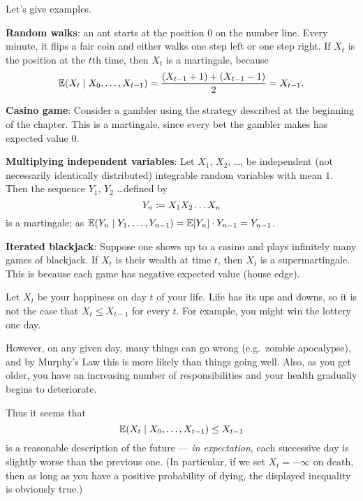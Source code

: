 Let's give examples.
\begin{example}
	[Supermartingales]
	\listhack
	\begin{enumerate}[(a)]
		\ii \textbf{Random walks}:
		an ant starts at the position $0$ on the number line.
		Every minute, it flips a fair coin and either
		walks one step left or one step right.
		If $X_t$ is the position at the $t$th time,
		then $X_t$ is a martingale, because
		\[ \mathbb E(X_t \mid X_0, \dots, X_{t-1})
			= \frac{(X_{t-1}+1) + (X_{t-1}-1)}{2} = X_{t-1}. \]

		\ii \textbf{Casino game}:
		Consider a gambler using the strategy described
		at the beginning of the chapter.
		This is a martingale, since every bet the gambler makes
		has expected value $0$.

		\ii \textbf{Multiplying independent variables}:
		Let $X_1$, $X_2$, \dots, be independent (not necessarily
		identically distributed) integrable random variables with mean $1$.
		Then the sequence $Y_1$, $Y_2$ \dots defined by
		\[ Y_n \coloneqq X_1 X_2 \dots X_n \]
		is a martingale; as
		$\mathbb E(Y_n \mid Y_1, \dots, Y_{n-1}) = \mathbb E[Y_n] \cdot Y_{n-1} = Y_{n-1}$.

		\ii \textbf{Iterated blackjack}:
		Suppose one shows up to a casino and plays
		infinitely many games of blackjack.
		If $X_t$ is their wealth at time $t$, then $X_t$ is a supermartingale.
		This is because each game has negative expected value (house edge).
	\end{enumerate}
\end{example}

\begin{example}

	Let $X_t$ be your happiness on day $t$ of your life.
	Life has its ups and downs,
	so it is not the case that $X_t \le X_{t-1}$ for every $t$.
	For example, you might win the lottery one day.

	However, on any given day, many things can go wrong (e.g.\ zombie apocalypse),
	and by Murphy's Law this is more likely than things going well.
	Also, as you get older, you have an increasing number of responsibilities
	and your health gradually begins to deteriorate.

	Thus it seems that
	\[ \mathbb E(X_t \mid X_0, \dots, X_{t-1}) \le X_{t-1} \]
	is a reasonable description of the future ---
	\emph{in expectation}, each successive day is
	slightly worse than the previous one.
	(In particular, if we set $X_t = -\infty$ on death,
	then as long as you have a positive probability of dying,
	the displayed inequality is obviously true.)
\end{example}

